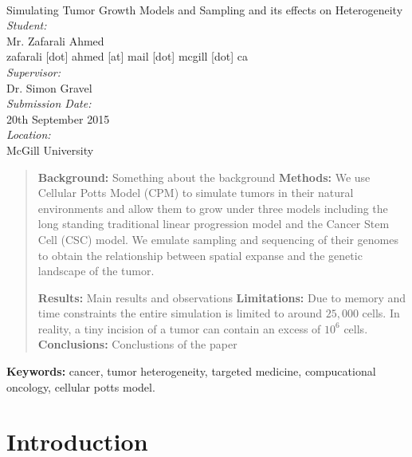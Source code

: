 \documentclass[12pt]{article}
\begin{document}
\begin{titlepage}
	\begin{center}
		~\\[2.0cm]
		{\Huge Simulating Tumor Growth Models and Sampling and its effects on Heterogeneity}\\[1.5cm]
		\emph{Student:}\\
		Mr. Zafarali Ahmed\\
		{\scriptsize zafarali [dot] ahmed [at] mail [dot] mcgill [dot] ca} \\[1.0cm]
		\emph{Supervisor:}\\
		Dr. Simon Gravel\\[1.0cm]
		\emph{Submission Date:}\\
		20th September 2015\\[1.0cm]
		\emph{Location:}\\
		McGill University
	\end{center}
\end{titlepage}

\begin{abstract}
\textbf{Background:}
Something about the background
\textbf{Methods:}
We use Cellular Potts Model (CPM) to simulate tumors in their natural environments and allow them to grow under three models including the long standing traditional linear progression model and the Cancer Stem Cell (CSC) model. We emulate sampling and sequencing of their genomes to obtain the relationship between spatial expanse and the genetic landscape of the tumor.

\textbf{Results:}
Main results and observations
\textbf{Limitations:}
Due to memory and time constraints the entire simulation is limited to around $25,000$ cells. In reality, a tiny incision of a tumor can contain an excess of $10^6$ cells.
\textbf{Conclusions:}
Conclustions of the paper

\end{abstract}

% 
% 
\textbf{Keywords:} cancer, tumor heterogeneity, targeted medicine, compucational oncology, cellular potts model.

% 
% 

\section{Introduction}
\end{document}
